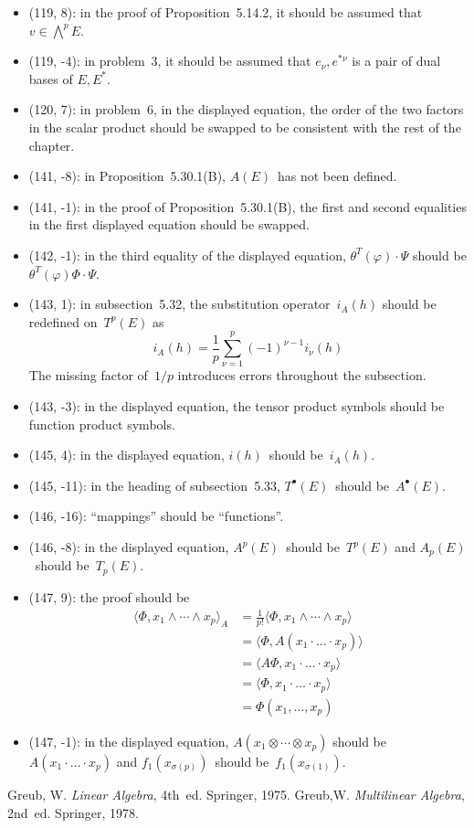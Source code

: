 \documentclass[letterpaper,12pt]{article}
\newcommand{\tprod}{\otimes}
\newcommand{\eprod}{\wedge}
\newcommand{\bigeprod}{\bigwedge}
\newcommand{\sprod}[2]{\langle#1,#2\rangle}
\begin{document}
\begin{itemize}
\item (119, 8): in the proof of Proposition~5.14.2, it should be assumed that \(v\in\bigeprod^p E\).
\item (119, -4): in problem~3, it should be assumed that \(e_{\nu},e^{*\nu}\) is a pair of dual bases of \(E,E^*\).
\item (120, 7): in problem~6, in the displayed equation, the order of the two factors in the scalar product should be swapped to be consistent with the rest of the chapter.
\item (141, -8): in Proposition~5.30.1(B), \(A(E)\)~has not been defined.
\item (141, -1): in the proof of Proposition~5.30.1(B), the first and second equalities in the first displayed equation should be swapped.
\item (142, -1): in the third equality of the displayed equation, \(\theta^T(\varphi)\cdot\Psi\) should be \(\theta^T(\varphi)\Phi\cdot\Psi\).
\item (143, 1): in subsection~5.32, the substitution operator~\(i_A(h)\) should be redefined on~\(T^p(E)\) as
\[i_A(h)=\frac{1}{p}\sum_{\nu=1}^p(-1)^{\nu-1}i_{\nu}(h)\]
The missing factor of~\(1/p\) introduces errors throughout the subsection.
\item (143, -3): in the displayed equation, the tensor product symbols should be function product symbols.
\item (145, 4): in the displayed equation, \(i(h)\)~should be~\(i_A(h)\).
\item (145, -11): in the heading of subsection~5.33, \(T^{\bullet}(E)\)~should be~\(A^{\bullet}(E)\).
\item (146, -16): ``mappings'' should be ``functions''.
\item (146, -8): in the displayed equation, \(A^p(E)\)~should be~\(T^p(E)\) and \(A_p(E)\)~should be~\(T_p(E)\).
\item (147, 9): the proof should be
\begin{align*}
\sprod{\Phi}{x_1\eprod\cdots\eprod x_p}_A&=\frac{1}{p!}\sprod{\Phi}{x_1\eprod\cdots\eprod x_p}\\
	&=\sprod{\Phi}{A(x_1\cdot\ldots\cdot x_p)}\\
	&=\sprod{A\Phi}{x_1\cdot\ldots\cdot x_p}\\
	&=\sprod{\Phi}{x_1\cdot\ldots\cdot x_p}\\
	&=\Phi(x_1,\ldots,x_p)
\end{align*}
\item (147, -1): in the displayed equation, \(A(x_1\tprod\cdots\tprod x_p)\) should be \(A(x_1\cdot\ldots\cdot x_p)\) and \(f_1(x_{\sigma(p)})\)~should be~\(f_1(x_{\sigma(1)})\).
\end{itemize}

\begin{thebibliography}{0}
 Greub, W. \textit{Linear Algebra}, 4th~ed. Springer, 1975.
 Greub,W. \textit{Multilinear Algebra}, 2nd~ed. Springer, 1978.
\end{thebibliography}
\end{document}
